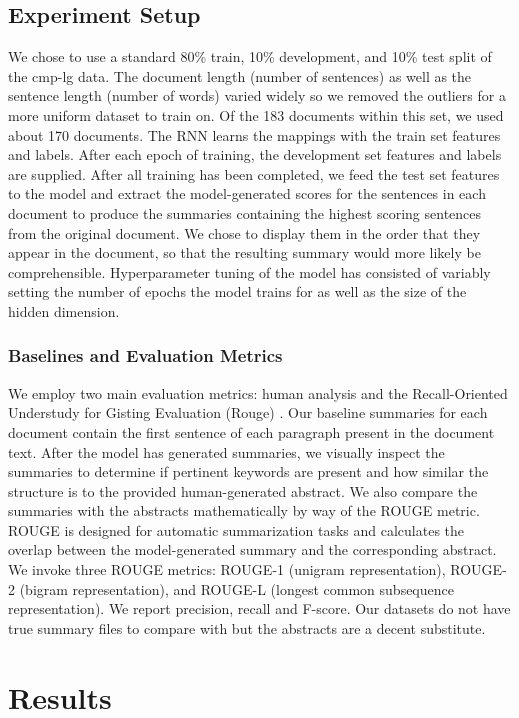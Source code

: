 \documentclass[11pt]{article}
\begin{document}
	\subsection{Experiment Setup} 
		We chose to use a standard 80\% train, 10\% development, and 10\% test split of the cmp-lg data. The document length (number of sentences) as well as the sentence length (number of words) varied widely so we removed the outliers for a more uniform dataset to train on. Of the 183 documents within this set, we used about 170 documents.
		The RNN learns the mappings with the train set features and labels. After each epoch of training, the development set features and labels are supplied. After all training has been completed, we feed the test set features to the model and extract the model-generated scores for the sentences in each document to produce the summaries containing the highest scoring sentences from the original document. We chose to display them in the order that they appear in the document, so that the resulting summary would more likely be comprehensible. Hyperparameter tuning of the model has consisted of variably setting the number of epochs the model trains for as well as the size of the hidden dimension. 
		\subsubsection{Baselines and Evaluation Metrics}
			We employ two main evaluation metrics: human analysis and the Recall-Oriented Understudy for Gisting Evaluation (Rouge) \cite{ganesan2015}. Our baseline summaries for each document contain the first sentence of each paragraph present in the document text. After the model has generated summaries, we visually inspect the summaries to determine if pertinent keywords are present and how similar the structure is to the provided human-generated abstract. We also compare the summaries with the abstracts mathematically by way of the ROUGE metric. ROUGE is designed for automatic summarization tasks and calculates the overlap between the model-generated summary and the corresponding abstract. We invoke three ROUGE metrics: ROUGE-1 (unigram representation), ROUGE-2 (bigram representation), and ROUGE-L (longest common subsequence representation). We report precision, recall and F-score. Our datasets do not have true summary files to compare with but the abstracts are a decent substitute.
			
\section{Results} %
\end{document}
